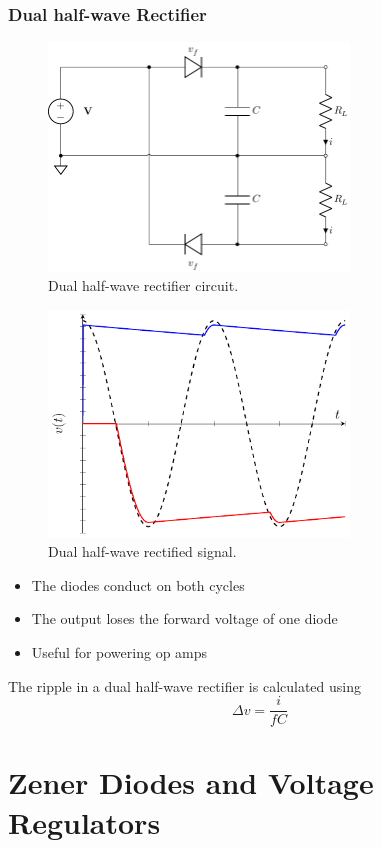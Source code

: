 \documentclass{article}
\begin{document}
\subsubsection{Dual half-wave Rectifier}
\begin{figure}[H]
    \centering
    \includegraphics[width = 8cm, keepaspectratio = true]{figures/dual_half_wave_rectifier.pdf}
    \caption{Dual half-wave rectifier circuit.}
\end{figure}
\begin{figure}[H]
    \centering
    \includegraphics[width = 8cm, keepaspectratio = true]{figures/dual_half_wave_rectifier_plot.pdf}
    \caption{Dual half-wave rectified signal.}
\end{figure}
\begin{itemize}
    \item The diodes conduct on both cycles
    \item The output loses the forward voltage of one diode
    \item Useful for powering op amps
\end{itemize}
The ripple in a dual half-wave rectifier is calculated using
\begin{equation*}
    \Delta v = \frac{i}{fC}
\end{equation*}
\newpage
\section{Zener Diodes and Voltage Regulators}
\end{document}
